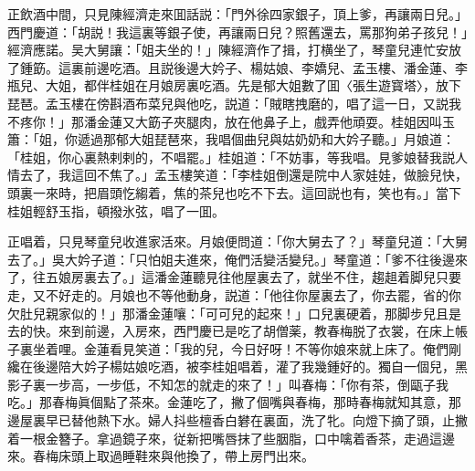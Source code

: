 正飲酒中間，只見陳經濟走來囬話説：「門外徐四家銀子，頂上爹，再讓兩日兒。」西門慶道：「胡説！我這裏等銀子使，再讓兩日兒？照舊還去，罵那狗弟子孩兒！」經濟應諾。吴大舅讓：「姐夫坐的！」陳經濟作了揖，打横坐了，琴童兒連忙安放了鍾筯。這裏前邊吃酒。且説後邊大妗子、楊姑娘、李嬌兒、孟玉樓、潘金蓮、李瓶兒、大姐，都伴桂姐在月娘房裏吃酒。先是郁大姐數了囬〈張生遊寳塔〉，放下琵琶。孟玉樓在傍斟酒布菜兒與他吃，説道：「賊瞎拽磨的，唱了這一日，又説我不疼你！」那潘金蓮又大筯子夾腿肉，放在他鼻子上，戲弄他頑耍。桂姐因叫玉簫：「姐，你遞過那郁大姐琵琶來，我唱個曲兒與姑奶奶和大妗子聽。」月娘道：「桂姐，你心裏熱剌剌的，不唱罷。」桂姐道：「不妨事，等我唱。見爹娘替我説人情去了，我這回不焦了。」孟玉樓笑道：「李桂姐倒還是院中人家娃娃，做臉兒快，頭裏一來時，把眉頭忔縐着，焦的茶兒也吃不下去。這回説也有，笑也有。」當下桂姐輕舒玉指，頓撥氷弦，唱了一囬。

正唱着，只見琴童兒收進家活來。月娘便問道：「你大舅去了？」琴童兒道：「大舅去了。」吳大妗子道：「只怕姐夫進來，俺們活變活變兒。」琴童道：「爹不往後邊來了，往五娘房裏去了。」這潘金蓮聽見往他屋裏去了，就坐不住，趨趄着脚兒只要走，又不好走的。月娘也不等他動身，説道：「他往你屋裏去了，你去罷，省的你欠肚兒親家似的！」那潘金蓮嚷：「可可兒的起來！」口兒裏硬着，那脚步兒且是去的快。來到前邊，入房來，西門慶已是吃了胡僧薬，教春梅脱了衣裳，在床上帳子裏坐着哩。金蓮看見笑道：「我的兒，今日好呀！不等你娘來就上床了。俺們剛纔在後邊陪大妗子楊姑娘吃酒，被李桂姐唱着，灌了我幾鍾好的。獨自一個兒，黑影子裏一步高，一步低，不知怎的就走的來了！」叫春梅：「你有茶，倒甌子我吃。」那春梅眞個點了茶來。金蓮吃了，撇了個嘴與春梅，那時春梅就知其意，那邊屋裏早已替他熱下水。婦人抖些檀香白礬在裏面，洗了牝。向燈下摘了頭，止撇着一根金簪子。拿過鏡子來，従新把嘴唇抹了些胭脂，口中噙着香茶，走過這邊來。春梅床頭上取過睡鞋來與他換了，帶上房門出來。

